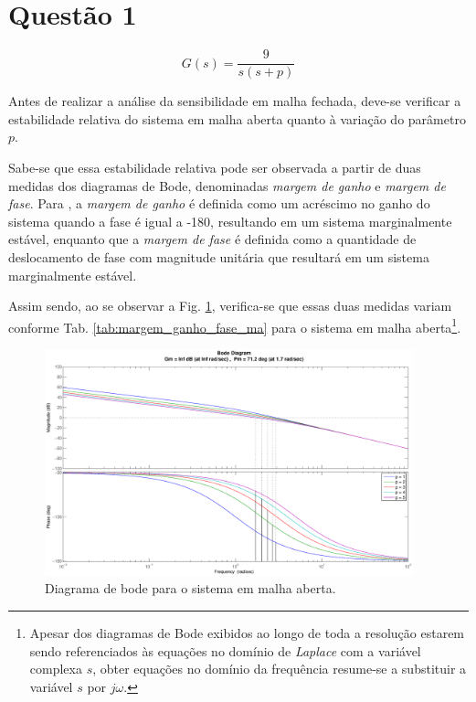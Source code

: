 \section*{Questão 1}

\begin{equation}\nonumber
G(s) = \frac{9}{s(s+p)}
\end{equation}


\vspace{0.5cm}


\vspace{0.25cm}

Antes de realizar a análise da sensibilidade em malha fechada, deve-se verificar
a estabilidade relativa do sistema em malha aberta quanto à variação do
parâmetro $p$. 

Sabe-se que essa estabilidade relativa pode ser observada a partir de duas
medidas dos diagramas de Bode, denominadas {\it margem de ganho} e {\it margem
de fase}. Para , a {\it margem de ganho} é definida como
um acréscimo no ganho do sistema quando a fase é igual a -180\textdegree,
resultando em um sistema marginalmente estável, enquanto que a {\it margem de
fase} é definida como a quantidade de deslocamento de fase com magnitude
unitária que resultará em um sistema marginalmente estável.

Assim sendo, ao se observar a Fig. \ref{fig:bode_ma}, verifica-se que essas duas
medidas variam conforme Tab. \ref{tab:margem_ganho_fase_ma} para o sistema em
malha aberta\footnote{Apesar dos diagramas de Bode exibidos ao longo de toda a
resolução estarem sendo referenciados às equações no domínio de {\it Laplace}
com a variável complexa $s$, obter equações no domínio da frequência resume-se a
substituir a variável $s$ por $j\omega$.}.

\begin{figure}[htb]
\centering
    \includegraphics[width=0.95\textwidth]{imgs/questao1/bode_ma}
    \caption{Diagrama de bode para o sistema em malha aberta.}
    \label{fig:bode_ma}
\end{figure}


